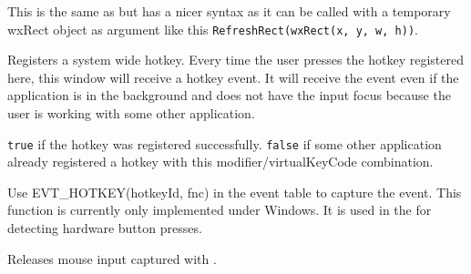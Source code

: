 This is the same as  but has a nicer syntax
as it can be called with a temporary wxRect object as argument like this
\texttt{RefreshRect(wxRect(x, y, w, h))}.


\label{wxwindowregisterhotkey}


Registers a system wide hotkey. Every time the user presses the hotkey registered here, this window
will receive a hotkey event. It will receive the event even if the application is in the background
and does not have the input focus because the user is working with some other application.






{\tt true} if the hotkey was registered successfully. {\tt false} if some other application already registered a
hotkey with this modifier/virtualKeyCode combination.


Use EVT\_HOTKEY(hotkeyId, fnc) in the event table to capture the event.
This function is currently only implemented under Windows. It is used
in the  for detecting hardware button presses.




\label{wxwindowreleasemouse}


Releases mouse input captured with .


